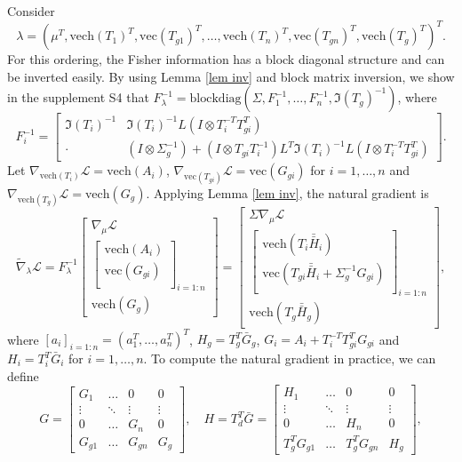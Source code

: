 \documentclass{statsoc}
\newcommand\blockdiag{{\text{blockdiag}}}
\newcommand\mL{{\mathcal{L}}}
\newcommand{\vc}{\text{vec}}
\newcommand{\vech}{\text{vech}}
\newcommand{\dH}{\bar{\bar{H}}}
\begin{document}
Consider
\[
\lambda = (\mu^T , \vech(T_1)^T , \vc(T_{g1})^T , \dots,  \vech(T_n)^T ,\vc(T_{gn})^T , \vech(T_g)^T )^T . 
\]
For this ordering, the Fisher information has a block diagonal structure and can be inverted easily. By using Lemma \ref{lem inv} and block matrix inversion, we show in the supplement S4 that $F_\lambda^{-1} = \blockdiag(\Sigma, F_1^{-1}, \dots, F_n^{-1}, \mathfrak{I}(T_g)^{-1} )$, where
\[
F_i^{-1} = \begin{bmatrix}
\mathfrak{I}(T_i)^{-1} & \mathfrak{I}(T_i)^{-1} L (I \otimes T_i^{-T} T_{gi}^T)  \\
\cdot &  (I \otimes \Sigma_g^{-1}) +  (I \otimes T_{gi} T_i^{-1}) L^T \mathfrak{I}(T_i)^{-1} L (I \otimes T_i^{-T} T_{gi}^T)
\end{bmatrix}.
\]
Let $\nabla_{\vech(T_i)} \mL = \vech(A_i)$, $\nabla_{\vc(T_{gi})} \mL = \vc(G_{gi})$ for $i=1, \dots, n$ and $\nabla_{\vech(T_g)} \mL = \vech(G_g)$.  Applying Lemma \ref{lem inv}, the natural gradient is 
\[
\widetilde{\nabla}_\lambda \mL = F_\lambda^{-1}  \begin{bmatrix}
\nabla_\mu \mL \\ 
\begin{bmatrix} \vech (A_i)  \\  \vc(G_{gi})  \\  \end{bmatrix}_{i=1:n} \\ 
\vech(G_g)
\end{bmatrix} = \begin{bmatrix}
\Sigma \nabla_\mu \mL \\
\begin{bmatrix}
\vech (T_i \dH_i) \\
\vc( T_{gi}\dH_i +  \Sigma_g^{-1} G_{gi}) \\
\end{bmatrix}_{i=1:n} \\
\vech(T_g \dH_g)
\end{bmatrix},
\]
where $[a_i]_{i=1:n} = (a_1^T , \dots, a_n^T )^T $, $H_g = T_g^T  \bar{G}_{g}$, $G_i = A_i + T_i^{-T} T_{gi}^T G_{gi}$ and $H_i = T_i^T  \bar{G}_i$ for $i=1, \dots, n$. To compute the natural gradient in practice, we can define 
\begin{equation*}
G = \begin{bmatrix}
G_1  &  \dots & 0 & 0 \\
\vdots & \ddots & \vdots & \vdots \\
0 & \dots  & G_n  & 0 \\
G_{g1} & \dots & G_{gn}  & G_g 
\end{bmatrix}, \quad 
H = T_d^T \bar{G} =  \begin{bmatrix}
H_1 &  \dots & 0 & 0 \\
\vdots & \ddots & \vdots & \vdots \\
0 & \dots  & H_n & 0 \\
T_g^T  G_{g1}  & \dots & T_g^TG_{gn}  & H_g
\end{bmatrix},
\end{equation*}
\end{document}
